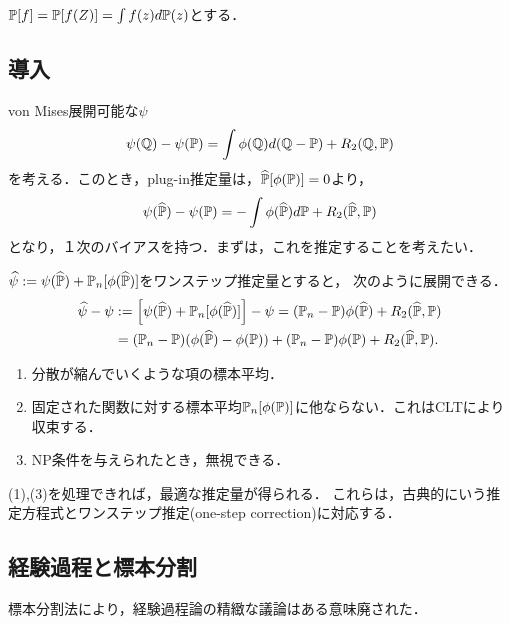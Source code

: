 \documentclass[uplatex,dvipdfmx]{jsreport}
\begin{document}
\begin{notation}
    $\mathbb{P}[f]=\mathbb{P}[f(Z)]=\int f(z)d\mathbb{P}(z)$とする．
\end{notation}

\subsection{導入}

\begin{problem}
    von Mises展開可能な$\psi$
    \[\psi(\mathbb{Q})-\psi(\mathbb{P})=\int\phi(\mathbb{Q})d(\mathbb{Q}-\mathbb{P})+R_2(\mathbb{Q},\mathbb{P})\]
    を考える．このとき，plug-in推定量は，$\widehat{\mathbb{P}}[\phi(\mathbb{P})]=0$より，
    \[\psi(\widehat{\mathbb{P}})-\psi(\mathbb{P})=-\int\phi(\widehat{\mathbb{P}})d\mathbb{P}+R_2(\widehat{\mathbb{P}},\mathbb{P})\]
    となり，１次のバイアスを持つ．まずは，これを推定することを考えたい．
\end{problem}
\begin{discussion}
    $\widehat{\psi}:=\psi(\widehat{\mathbb{P}})+\mathbb{P}_n[\phi(\widehat{\mathbb{P}})]$をワンステップ推定量とすると，
    次のように展開できる．
    \begin{align*}
        \widehat{\psi}-\psi&:=\left[\psi(\widehat{\mathbb{P}})+\mathbb{P}_n[\phi(\widehat{\mathbb{P}})]\right]-\psi
        =(\mathbb{P}_n-\mathbb{P})\phi(\widehat{\mathbb{P}})+R_2(\widehat{\mathbb{P}},\mathbb{P})\\
        &=(\mathbb{P}_n-\mathbb{P})(\phi(\widehat{\mathbb{P}})-\phi(\mathbb{P}))+(\mathbb{P}_n-\mathbb{P})\phi(\mathbb{P})+R_2(\widehat{\mathbb{P}},\mathbb{P}).
    \end{align*}
    \begin{enumerate}
        \item 分散が縮んでいくような項の標本平均．
        \item 固定された関数に対する標本平均$\mathbb{P}_n[\phi(\mathbb{P})]$に他ならない．これはCLTにより収束する．
        \item NP条件を与えられたとき，無視できる．
    \end{enumerate}
    (1),(3)を処理できれば，最適な推定量が得られる．
    これらは，古典的にいう推定方程式とワンステップ推定(one-step correction)に対応する．
\end{discussion}

\subsection{経験過程と標本分割}

\begin{tcolorbox}[colframe=ForestGreen, colback=ForestGreen!10!white,breakable,colbacktitle=ForestGreen!40!white,coltitle=black,fonttitle=\bfseries\sffamily,
title=]
    標本分割法により，経験過程論の精緻な議論はある意味廃された．
\end{tcolorbox}
\end{document}

